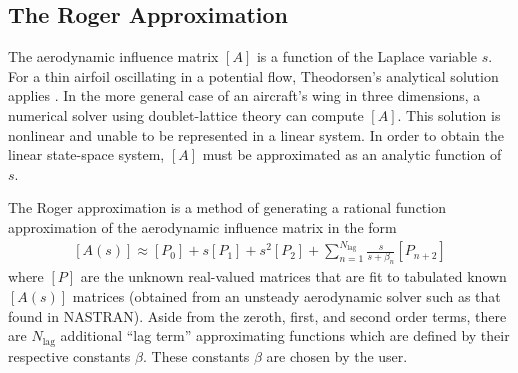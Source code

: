\subsection{The Roger Approximation} %

The aerodynamic influence matrix $[A]$ is a function of the Laplace variable $s$. For a thin airfoil oscillating in a potential flow, Theodorsen's analytical solution applies \cite{Theodorsen1949}. In the more general case of an aircraft's wing in three dimensions, a numerical solver using doublet-lattice theory can compute $[A]$. This solution is nonlinear and unable to be represented in a linear system. In order to obtain the linear state-space system, $[A]$ must be approximated as an analytic function of $s$.

The Roger approximation \cite{Roger1977} is a method of generating a rational function approximation of the aerodynamic influence matrix in the form
\begin{align}
	\label{eq:RogerApprox}
    [A(s)] \approx [P_0] + s [P_1] + s^2 [P_2] + \sum_{n=1}^{N_\text{lag}} \frac{s}{s+\beta_n} [P_{n+2}]
\end{align}
where $[P]$ are the unknown real-valued matrices that are fit to tabulated known $[A(s)]$ matrices (obtained from an unsteady aerodynamic solver such as that found in NASTRAN). Aside from the zeroth, first, and second order terms, there are $N_\text{lag}$ additional ``lag term'' approximating functions which are defined by their respective constants $\beta$. These constants $\beta$ are chosen by the user.

